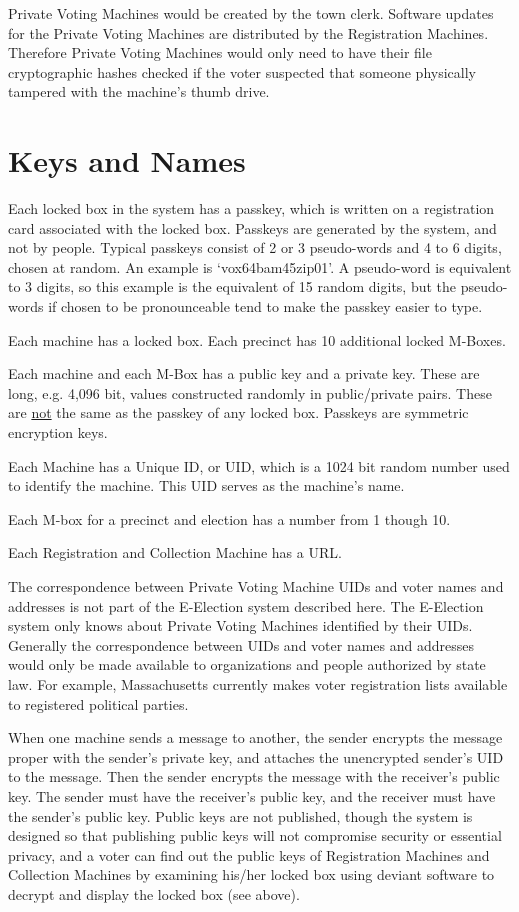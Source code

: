 \documentclass[12pt]{article}
\begin{document}
Private Voting Machines would be created by the town clerk.
Software updates for the Private Voting Machines are distributed
by the Registration Machines.  Therefore Private Voting Machines
would only need to have their file cryptographic hashes checked if the voter
suspected that someone physically tampered with the machine's thumb drive.



\section{Keys and Names}

Each locked box in the system has a passkey, which is
written on a registration card associated with the locked
box.  Passkeys are generated by the system, and not by
people.  Typical passkeys consist of 2 or 3 pseudo-words
and 4 to 6 digits, chosen at random.  An example is
`vox64bam45zip01'.  A pseudo-word is equivalent to 3
digits, so this example is the equivalent of 15 random
digits, but the pseudo-words if chosen to be pronounceable
tend to make the passkey easier to type.

Each machine has a locked box.  Each precinct
has 10 additional locked M-Boxes.

Each machine and each M-Box has a public key and a private key.  These
are long, e.g. 4,096 bit, values constructed randomly
in public/private pairs.
These are \underline{not} the same as the passkey of any locked box.
Passkeys are symmetric encryption keys.

Each Machine
has a Unique ID, or UID, which is a 1024 bit random number
used to identify the machine.  This UID serves as the
machine's name.

Each M-box for a precinct and election has a number from 1 though 10.

Each Registration and Collection Machine has a URL.

The correspondence between Private Voting Machine UIDs
and voter names and addresses is not part of the E-Election system
described here.  The E-Election system only knows about
Private Voting Machines identified by their UIDs.
Generally the correspondence between UIDs and voter names and addresses
would only be made available
to organizations and people authorized by state law.
For example, Massachusetts currently makes voter registration lists
available to registered political parties.

When one machine sends a message to another, the sender
encrypts the message proper with the sender's private
key, and attaches the unencrypted sender's UID to the
message.  Then the sender encrypts the message with the
receiver's public key.  The sender must have the receiver's
public key, and the receiver must have the sender's public
key.  Public keys are not published,
though the system is designed so that publishing public
keys will not compromise security or essential privacy,
and a voter can find out the public keys of Registration
Machines and Collection Machines by examining his/her locked
box using deviant software to decrypt and
display the locked box (see \pageref{DEVIANT-SOFTWARE} above).
\end{document}

